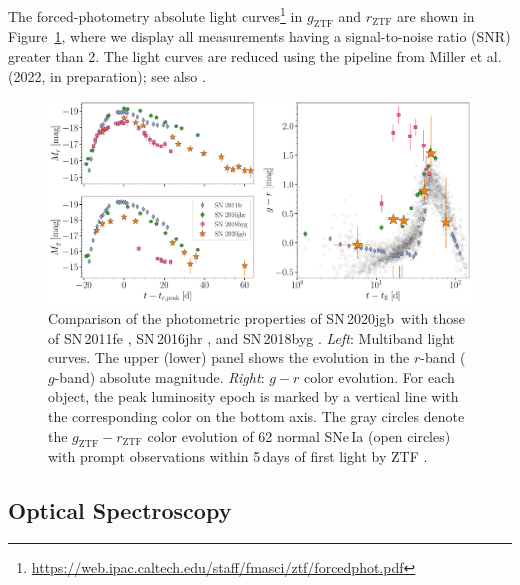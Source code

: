 \documentclass[twocolumn]{aastex631}
\newcommand{\sn}{SN\,2020jgb}
\begin{document}
The forced-photometry absolute light curves\footnote{\url{https://web.ipac.caltech.edu/staff/fmasci/ztf/forcedphot.pdf}} in $g_\mathrm{ZTF}$ and $r_\mathrm{ZTF}$ are shown in Figure~\ref{fig:photometry}, where we display all measurements having a signal-to-noise ratio (SNR) greater than 2. The light curves are reduced using the pipeline from Miller et al. (2022, in preparation); see also \citet{Yao_2019}.

\begin{figure}
    \centering
    \includegraphics[width=\textwidth]{photometry.pdf}
    \caption{Comparison of the photometric properties of \sn\ with those of SN\,2011fe \citep[normal SN\,Ia;][]{Pereira_2013}, SN\,2016jhr \citep[normal-luminosity He-shell DDet;][]{jiang_16jhr_2017}, and SN\,2018byg \citep[subluminous He-shell DDet;][]{de_18byg_2019}. \textit{Left}: Multiband light curves. The upper (lower) panel shows the evolution in the $r$-band ($g$-band) absolute magnitude. \textit{Right}: $g-r$ color evolution. For each object, the peak luminosity epoch is marked by a vertical line with the corresponding color on the bottom axis. The gray circles denote the $g_\mathrm{ZTF}-r_\mathrm{ZTF}$ color evolution of 62 normal SNe\,Ia (open circles) with prompt observations within 5\,days of first light by ZTF \citep{Bulla2020}. }
    \label{fig:photometry}
\end{figure}

\subsection{Optical Spectroscopy}\label{sec:optical_spec}
\end{document}
